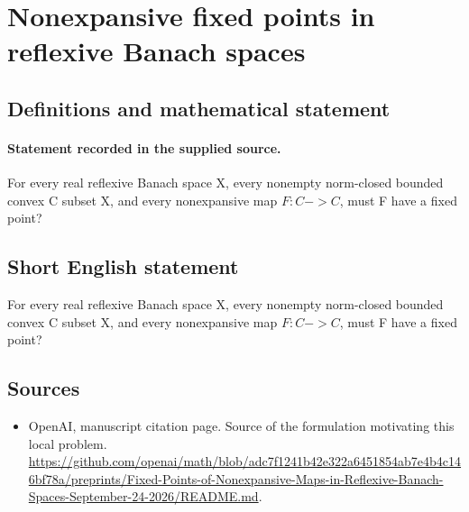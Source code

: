 \documentclass[11pt]{article}
\begin{document}
\section*{Nonexpansive fixed points in reflexive Banach spaces}\label{statement}
\subsection{Definitions and mathematical statement}
\paragraph{Statement recorded in the supplied source.}
For every real reflexive Banach space X, every nonempty norm-closed bounded convex C subset X, and every nonexpansive map $F:C->C$, must F have a fixed point?
\subsection{Short English statement}
For every real reflexive Banach space X, every nonempty norm-closed bounded convex C subset X, and every nonexpansive map $F:C->C$, must F have a fixed point?
\subsection{Sources}
\begin{itemize}
\item[S1] OpenAI, manuscript citation page. Source of the formulation motivating this local problem.
\url{https://github.com/openai/math/blob/adc7f1241b42e322a6451854ab7e4b4c146bf78a/preprints/Fixed-Points-of-Nonexpansive-Maps-in-Reflexive-Banach-Spaces-September-24-2026/README.md}.
\end{itemize}
\end{document}
